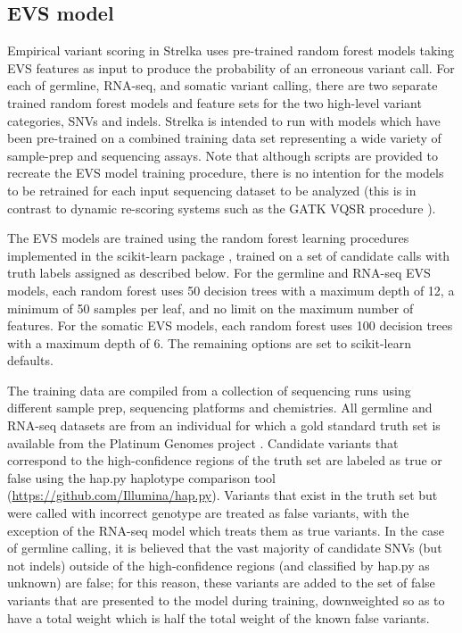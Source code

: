 \documentclass{article}
\begin{document}
\subsection{EVS model}
\label{sec:EVSModel}

Empirical variant scoring in Strelka uses pre-trained random forest models taking EVS features as input to produce the probability of an erroneous variant call. For each of germline, RNA-seq, and somatic variant calling, there are two separate trained random forest models and feature sets for the two high-level variant categories, SNVs and indels. Strelka is intended to run with models which have been pre-trained on a combined training data set representing a wide variety of sample-prep and sequencing assays. Note that although scripts are provided to recreate the EVS model training procedure, there is no intention for the models to be retrained for each input sequencing dataset to be analyzed (this is in contrast to dynamic re-scoring systems such as the GATK VQSR procedure \cite{depristo2011}).

The EVS models are trained using the random forest learning procedures implemented in the scikit-learn package \cite{scikit-learn}, trained on a set of candidate calls with truth labels assigned as described below. For the germline and RNA-seq EVS models, each random forest uses 50 decision trees with a maximum depth of 12, a minimum of 50 samples per leaf, and no limit on the maximum number of features. For the somatic EVS models, each random forest uses 100 decision trees with a maximum depth of 6. The remaining options are set to scikit-learn defaults.

The training data are compiled from a collection of sequencing runs using different sample prep, sequencing platforms and chemistries. All germline and RNA-seq datasets are from an individual for which a gold standard truth set is available from the Platinum Genomes project \cite{eberle2017}. Candidate variants that correspond to the high-confidence regions of the truth set are labeled as true or false using the hap.py haplotype comparison tool (\url{https://github.com/Illumina/hap.py}). Variants that exist in the truth set but were called with incorrect genotype are treated as false variants, with the exception of the RNA-seq model which treats them as true variants. In the case of germline calling, it is believed that the vast majority of candidate SNVs (but not indels) outside of the high-confidence regions (and classified by hap.py as unknown) are false; for this reason, these variants are added to the set of false variants that are presented to the model during training, downweighted so as to have a total weight which is half the total weight of the known false variants.
\end{document}
